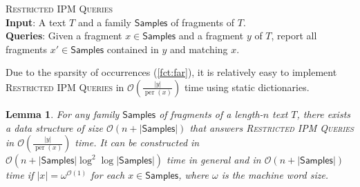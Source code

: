 \documentclass[a4paper]{article}
\newtheorem{lemma}[theorem]{Lemma}
\theoremstyle{definition}
\theoremstyle{remark}
\newcommand{\RIPM}{\textsc{Restricted IPM Queries}\xspace}
\newcommand{\R}{\mathsf{Samples}}
\DeclareMathOperator{\per}{per}
\newcommand{\Oh}{\mathcal{O}}
\newenvironment{dsproblem}[1]
{\begin{center}\begin{lrbox}{\mybox}\begin{minipage}{0.96\columnwidth}{\textsc{#1}}\\}
{\end{minipage}\end{lrbox}\fbox{\usebox{\mybox}}\end{center}}
\newcommand{\defdsproblem}[2]{
  \begin{dsproblem}{#1}
#2
  \end{dsproblem}
  }
\begin{document}
\defdsproblem{\RIPM}{
\textbf{Input}: A text $T$ and a family $\R$ of fragments of $T$.\\
\textbf{Queries}: Given a fragment $x\in \R$ and a fragment $y$ of $T$, report all fragments $x'\in \R$
contained in $y$ and matching $x$.
}

Due to the sparsity of occurrences (\cref{fct:far}),
it is relatively easy to implement \RIPM in $\Oh(\frac{|y|}{\per(x)})$ time using static dictionaries.

\begin{lemma}\label{lem:locator}
For any family $\R$ of fragments of a length-$n$ text $T$, there exists a data structure of size $\Oh(n+|\R|)$
that answers \RIPM in $\Oh(\frac{|y|}{\per(x)})$ time. It can be constructed in $\Oh(n+|\R|\log^2 \log |\R|)$ time
in general and in $\Oh(n+|\R|)$ time if $|x|=\omega^{\Oh(1)}$ for each $x\in \R$, where $\omega$ is the machine word size.
\end{lemma}
\end{document}
